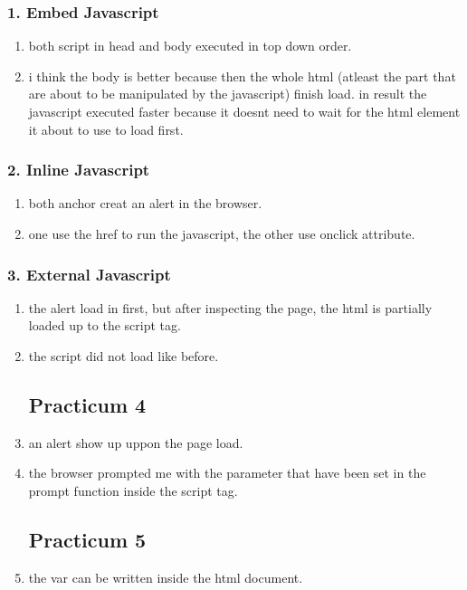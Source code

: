 \documentclass[12pt,titlepage]{article}
\begin{document}
\subsubsection*{1. Embed Javascript}
\begin{enumerate}
    \item both script in head and body executed in top down order. 
    \item i think the body is better because then the whole html (atleast the part that are about to be manipulated by the javascript) finish load. in result the javascript executed faster because it doesnt need to wait for the html element it about to use to load first. 
\end{enumerate}

\subsubsection*{2. Inline Javascript}
\begin{enumerate}
    \item both anchor creat an alert in the browser. 
    \item one use the href to run the javascript, the other use onclick attribute. 
\end{enumerate}

\subsubsection*{3. External Javascript}
\begin{enumerate}
    \item the alert load in first, but after inspecting the page, the html is partially loaded up to the script tag.
    \item the script did not load like before.
    \subsection*{Practicum 4}
    \item an alert show up uppon the page load.
    \item the browser prompted me with the parameter that have been set in the prompt function inside the script tag.
    \subsection*{Practicum 5}
    \item the var can be written inside the html document.
\end{enumerate}
\end{document}
